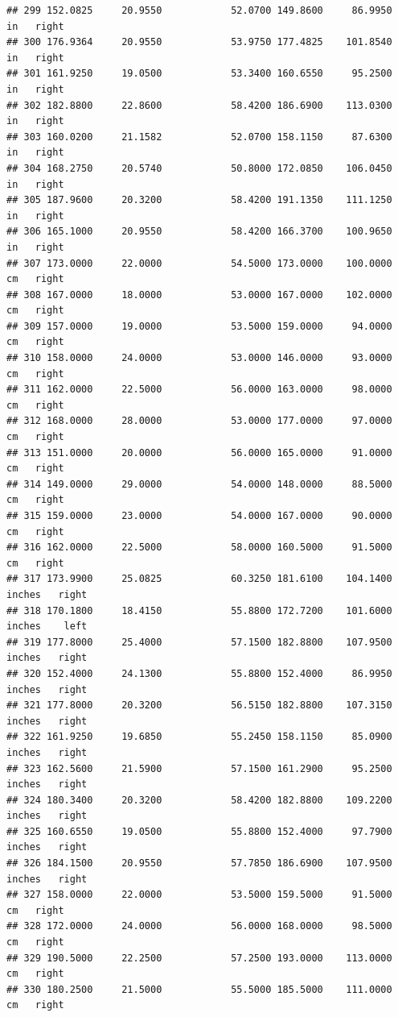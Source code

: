 \documentclass[]{article}
\begin{document}
\begin{verbatim}
## 299 152.0825     20.9550            52.0700 149.8600     86.9950     in   right
## 300 176.9364     20.9550            53.9750 177.4825    101.8540     in   right
## 301 161.9250     19.0500            53.3400 160.6550     95.2500     in   right
## 302 182.8800     22.8600            58.4200 186.6900    113.0300     in   right
## 303 160.0200     21.1582            52.0700 158.1150     87.6300     in   right
## 304 168.2750     20.5740            50.8000 172.0850    106.0450     in   right
## 305 187.9600     20.3200            58.4200 191.1350    111.1250     in   right
## 306 165.1000     20.9550            58.4200 166.3700    100.9650     in   right
## 307 173.0000     22.0000            54.5000 173.0000    100.0000     cm   right
## 308 167.0000     18.0000            53.0000 167.0000    102.0000     cm   right
## 309 157.0000     19.0000            53.5000 159.0000     94.0000     cm   right
## 310 158.0000     24.0000            53.0000 146.0000     93.0000     cm   right
## 311 162.0000     22.5000            56.0000 163.0000     98.0000     cm   right
## 312 168.0000     28.0000            53.0000 177.0000     97.0000     cm   right
## 313 151.0000     20.0000            56.0000 165.0000     91.0000     cm   right
## 314 149.0000     29.0000            54.0000 148.0000     88.5000     cm   right
## 315 159.0000     23.0000            54.0000 167.0000     90.0000     cm   right
## 316 162.0000     22.5000            58.0000 160.5000     91.5000     cm   right
## 317 173.9900     25.0825            60.3250 181.6100    104.1400 inches   right
## 318 170.1800     18.4150            55.8800 172.7200    101.6000 inches    left
## 319 177.8000     25.4000            57.1500 182.8800    107.9500 inches   right
## 320 152.4000     24.1300            55.8800 152.4000     86.9950 inches   right
## 321 177.8000     20.3200            56.5150 182.8800    107.3150 inches   right
## 322 161.9250     19.6850            55.2450 158.1150     85.0900 inches   right
## 323 162.5600     21.5900            57.1500 161.2900     95.2500 inches   right
## 324 180.3400     20.3200            58.4200 182.8800    109.2200 inches   right
## 325 160.6550     19.0500            55.8800 152.4000     97.7900 inches   right
## 326 184.1500     20.9550            57.7850 186.6900    107.9500 inches   right
## 327 158.0000     22.0000            53.5000 159.5000     91.5000     cm   right
## 328 172.0000     24.0000            56.0000 168.0000     98.5000     cm   right
## 329 190.5000     22.2500            57.2500 193.0000    113.0000     cm   right
## 330 180.2500     21.5000            55.5000 185.5000    111.0000     cm   right

\end{verbatim}
\end{document}
